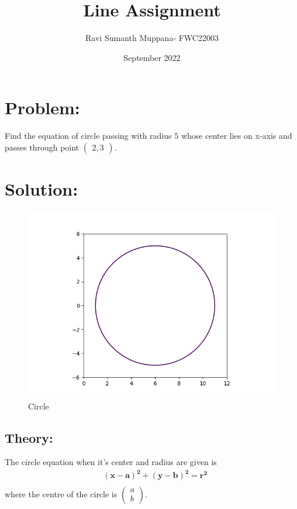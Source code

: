 \documentclass[a4paper,12pt,twocolumn]{article}
\title{Line Assignment}
\author{Ravi Sumanth Muppana- FWC22003}
\date{September 2022}
\let\vec\mathbf
\newcommand{\myvec}[1]{\ensuremath{\begin{pmatrix}#1\end{pmatrix}}}
\begin{document}
\maketitle
\section{Problem:}
Find the equation of circle passing with radius $5$ whose center lies on x-axis and passes through point $\myvec{2,3}$.
\maketitle
\section{Solution:}
\begin{figure}[h]
	\includegraphics[width=\linewidth]{conic.png}
\caption{Circle}
\end{figure}
\subsection{Theory:}
The circle equation when it's center and radius are given is
\begin{align}
	&\vec{(x-a)^2} + \vec{(y-b)^2} = \vec{r^2}\\
\end{align}
where the centre of the circle is $\myvec{a\\b}$.
\end{document}
